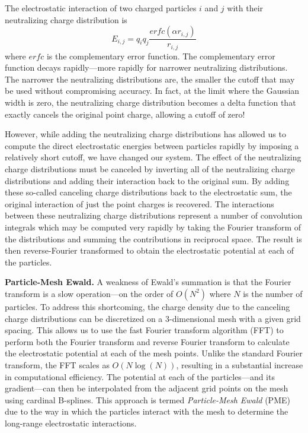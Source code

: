The electrostatic interaction of two charged particles $i$ and $j$ with their
neutralizing charge distribution is 
\begin{equation*}
   E_{i,j} = q_i q_j \frac {erfc(\alpha r_{i,j})} {r_{i,j}}
\end{equation*}
where $erfc$ is the complementary error function. The complementary error
function decays rapidly---more rapidly for narrower neutralizing distributions.
The narrower the neutralizing distributions are, the smaller the cutoff that may
be used without compromising accuracy. In fact, at the limit where the Gaussian
width is zero, the neutralizing charge distribution becomes a delta function
that exactly cancels the original point charge, allowing a cutoff of zero!

However, while adding the neutralizing charge distributions has allowed us to
compute the direct electrostatic energies between particles rapidly by imposing
a relatively short cutoff, we have changed our system. The effect of the
neutralizing charge distributions must be canceled by inverting all of the
neutralizing charge distributions and adding their interaction back to the
original sum. By adding these so-called canceling charge distributions back to
the electrostatic sum, the original interaction of just the point charges is
recovered. The interactions between these neutralizing charge distributions
represent a number of convolution integrals which may be computed very rapidly
by taking the Fourier transform of the distributions and summing the
contributions in reciprocal space. The result is then reverse-Fourier
transformed to obtain the electrostatic potential at each of the particles.
\cite{Allen_Tildesley}

\textbf{Particle-Mesh Ewald.} A weakness of Ewald's summation is that the
Fourier transform is a slow operation---on the order of $O(N^2)$ where $N$ is
the number of particles. To address this shortcoming, the charge density due to
the canceling charge distributions can be discretized on a 3-dimensional mesh
with a given grid spacing. This allows us to use the fast Fourier transform
algorithm (FFT) to perform both the Fourier transform and reverse Fourier
transform to calculate the electrostatic potential at each of the mesh points.
Unlike the standard Fourier transform, the FFT scales as $O(N\log(N))$,
resulting in a substantial increase in computational efficiency. The potential
at each of the particles---and its gradient---can then be interpolated from the
adjacent grid points on the mesh using cardinal B-splines.
\cite{Darden_Structure_1999_v7_p55} This approach is termed \emph{Particle-Mesh
Ewald} (PME) due to the way in which the particles interact with the mesh to
determine the long-range electrostatic interactions.


